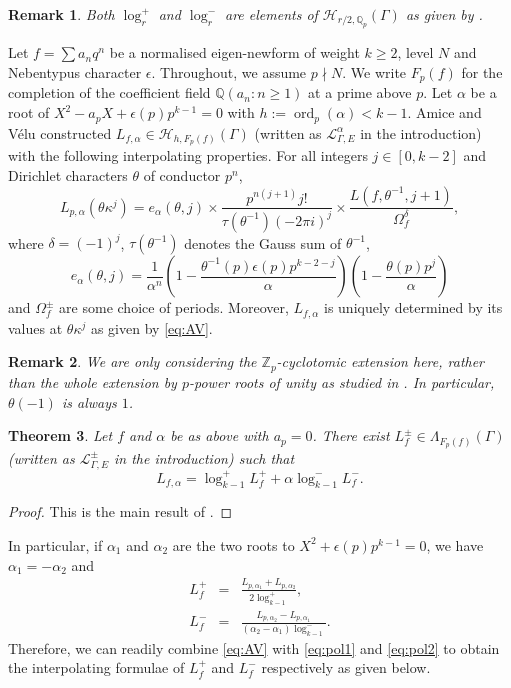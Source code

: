 \documentclass{amsart}
\newtheorem{theorem}{Theorem}[section]
\newtheorem{remark}[theorem]{Remark}
\begin{document}
\begin{remark}
Both $\log^+_r$ and $\log^-_r$ are elements of ${\mathcal{H}}_{r/2,{{\mathbb Q}_p}}(\Gamma)$ as given by \cite[Lemma~4.5]{pollack03}.
\end{remark}

 Let $f=\sum a_nq^n$ be a normalised eigen-newform of weight $k\ge2$, level $N$ and Nebentypus character $\epsilon$. Throughout, we assume $p\nmid N$. We write $F_p(f)$ for the completion of the coefficient field ${\mathbb Q}(a_n:n\ge1)$ at a prime above $p$. Let $\alpha$ be a root of $X^2-a_pX+\epsilon(p)p^{k-1}=0$ with $h:=\operatorname{ord}_p(\alpha)<k-1$. Amice and V\'{e}lu \cite{amicevelu75} constructed $L_{f,\alpha}\in{\mathcal{H}}_{h,F_p(f)}(\Gamma)$ (written as ${\mathcal{L}}^\alpha_{\Gamma,E}$ in the introduction) with the following interpolating properties. For all integers $j\in[0,k-2]$ and Dirichlet characters $\theta$ of conductor $p^n$, 
\begin{equation}\label{eq:AV}
L_{p,\alpha}(\theta\kappa^j)=e_\alpha(\theta,j)\times\frac{p^{n(j+1)}j!}{\tau(\theta^{-1})(-2\pi i)^j}\times\frac{L(f,\theta^{-1},j+1)}{\Omega_f^\delta},
\end{equation}
where $\delta=(-1)^j$, $\tau(\theta^{-1})$ denotes the Gauss sum of $\theta^{-1}$,
\[
e_\alpha(\theta,j)=\frac{1}{\alpha^n}\left(1-\frac{\theta^{-1}(p)\epsilon(p)p^{k-2-j}}{\alpha}\right)\left(1-\frac{\theta(p)p^j}{\alpha}\right)
\]
and $\Omega_f^\pm$ are some choice of periods.
Moreover, $L_{f,\alpha}$ is uniquely determined by its values at $\theta\kappa^j$ as given by \eqref{eq:AV}.

\begin{remark}\label{rk:even}
We are only considering the ${{\mathbb Z}_p}$-cyclotomic extension here, rather than the whole extension by $p$-power roots of unity as studied in \cite{amicevelu75}. In particular, $\theta(-1)$ is always $1$.
\end{remark}

\begin{theorem}\label{thm:pollack}
Let $f$ and $\alpha$ be as above with $a_p=0$. There exist $L_f^\pm\in\Lambda_{F_p(f)}(\Gamma)$ (written as ${\mathcal{L}}_{\Gamma,E}^\pm$ in the introduction) such that
\[
L_{f,\alpha}=\log_{k-1}^+L_f^++\alpha\log_{k-1}^-L_f^-.
\]
\end{theorem}
\begin{proof}
This is the main result of \cite{pollack03}.
\end{proof}

In particular, if $\alpha_1$ and $\alpha_2$ are the two roots to $X^2+\epsilon(p)p^{k-1}=0$, we have $\alpha_1=-\alpha_2$ and
\begin{eqnarray}
L_{f}^+&=&\frac{L_{p,\alpha_1}+L_{p,\alpha_2}}{2\log_{k-1}^+},\label{eq:pol1}\\
L_{f}^-&=&\frac{L_{p,\alpha_2}-L_{p,\alpha_1}}{(\alpha_2-\alpha_1)\log_{k-1}^-}\label{eq:pol2}.
\end{eqnarray}
Therefore, we can readily combine \eqref{eq:AV} with \eqref{eq:pol1} and \eqref{eq:pol2} to obtain the interpolating formulae of $L_{f}^+$ and $L_f^-$ respectively as given below.
\end{document}
